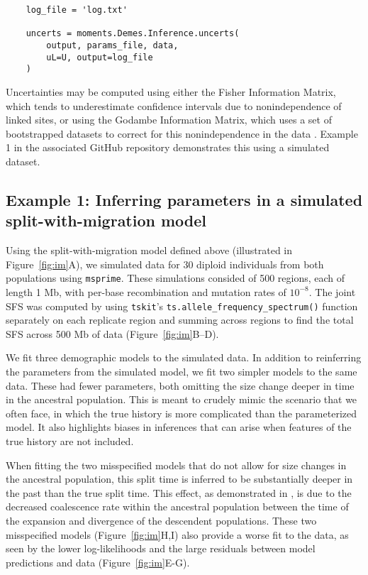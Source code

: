 \documentclass[]{article}
\newcommand{\msprime}{\texttt{msprime}\xspace}
\newcommand{\tskit}{\texttt{tskit}\xspace}
\begin{document}
\singlespacing
\begin{verbatim}
    log_file = 'log.txt'

    uncerts = moments.Demes.Inference.uncerts(
        output, params_file, data,
        uL=U, output=log_file
    )
\end{verbatim}
\doublespacing

Uncertainties may be computed using either the Fisher Information Matrix, which
tends to underestimate confidence intervals due to nonindependence of linked
sites, or using the Godambe Information Matrix, which uses a set of
bootstrapped datasets to correct for this nonindependence in the data
\cite{coffman2016computationally}. Example 1 in the associated GitHub
repository demonstrates this using a simulated dataset.

\subsection*{Example 1: Inferring parameters in a simulated split-with-migration model}

Using the split-with-migration model defined above (illustrated in
Figure~\ref{fig:im}A), we simulated data for 30 diploid individuals from both
populations using \msprime \cite{baumdicker2022efficient}. These simulations
consided of 500 regions, each of length 1 Mb, with per-base recombination and
mutation rates of $10^{-8}$. The joint SFS was computed by using \tskit's
\texttt{ts.allele\_frequency\_spectrum()} function separately on each replicate
region and summing across regions to find the total SFS across 500 Mb of data
(Figure~\ref{fig:im}B--D).

We fit three demographic models to the simulated data. In addition to
reinferring the parameters from the simulated model, we fit two simpler models
to the same data. These had fewer parameters, both omitting the size change
deeper in time in the ancestral population. This is meant to crudely mimic the
scenario that we often face, in which the true history is more complicated than
the parameterized model. It also highlights biases in inferences that can arise
when features of the true history are not included.

When fitting the two misspecified models that do not allow for size changes in
the ancestral population, this split time is inferred to be substantially
deeper in the past than the true split time. This effect, as demonstrated in
\cite{momigliano2021biases}, is due to the decreased coalescence rate within
the ancestral population between the time of the expansion and divergence of
the descendent populations. These two misspecified models
(Figure~\ref{fig:im}H,I) also provide a worse fit to the data, as seen by the
lower log-likelihoods and the large residuals between model predictions and
data (Figure~\ref{fig:im}E-G).
\end{document}
